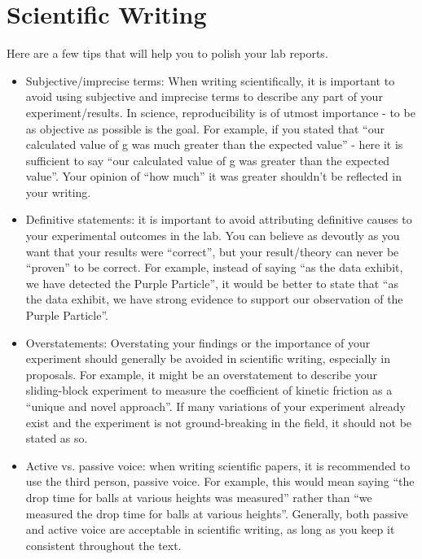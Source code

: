  \vspace{0.25cm}
\section{Scientific Writing}

Here are a few tips that will help you to polish your lab reports. %

\begin{itemize}
\item Subjective/imprecise terms: When writing scientifically, it is important to avoid using subjective and imprecise terms to describe any part of your experiment/results. In science, reproducibility is of utmost importance - to be as objective as possible is the goal. For example, if you stated that ``our calculated value of g was much greater than the expected value'' - here it is sufficient to say ``our calculated value of g was greater than the expected value''. Your opinion of ``how much'' it was greater shouldn't be reflected in your writing.
\item Definitive statements: it is important to avoid attributing definitive causes to your experimental outcomes in the lab. You can believe as devoutly as you want that your results were ``correct'', but your result/theory can never be ``proven'' to be correct. For example, instead of saying ``as the data exhibit, we have detected the Purple Particle'', it would be better to state that ``as the data exhibit, we have strong evidence to support our observation of the Purple Particle''. 
\item Overstatements: Overstating your findings or the importance of your experiment should generally be avoided in scientific writing, especially in proposals. For example, it might be an overstatement to describe your sliding-block experiment to measure the coefficient of kinetic friction as a ``unique and novel approach''. If many variations of your experiment already exist and the experiment is not ground-breaking in the field, it should not be stated as so.
\item Active vs. passive voice: when writing scientific papers, it is recommended to use the third person, passive voice. For example, this would mean saying ``the drop time for balls at various heights was measured'' rather than ``we measured the drop time for balls at various heights''. Generally, both passive and active voice are acceptable in scientific writing, as long as you keep it consistent throughout the text.
\end{itemize}

